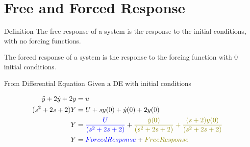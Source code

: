 \documentclass{../templates/topic}
\begin{document}
\chapter{Free and Forced Response}

\begin{section}{Definition}
	The free response of a system is the response to the initial conditions, with no forcing functions.
	
	The forced response of a system is the response to the forcing function with 0 initial conditions.
	
\end{section}

\begin{section}{From Differential Equation}
	Given a DE with initial conditions
	
	\begin{align}
		\ddot{y}+2\dot{y}+2y&=u\\
		(s^2+2s+2)Y&=U+sy(0)+\dot{y}(0)+2y(0)\\
		Y&=\textcolor{blue}{\frac{U}{(s^2+2s+2)}}+\textcolor{olive}{\frac{\dot{y}(0)}{(s^2+2s+2)}+\frac{(s+2)y(0)}{(s^2+2s+2)}}\\
		Y&=\textcolor{blue}{Forced Response}+\textcolor{olive}{Free Response}
	\end{align}
	
\end{section}
\end{document}
